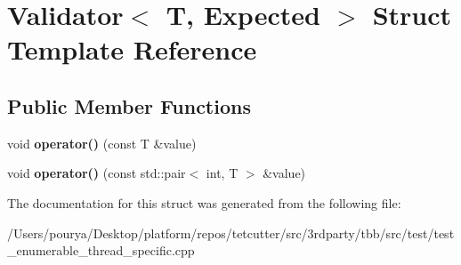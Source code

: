 \hypertarget{structValidator}{}\section{Validator$<$ T, Expected $>$ Struct Template Reference}
\label{structValidator}
\subsection*{Public Member Functions}
\begin{DoxyCompactItemize}
\item 
\hypertarget{structValidator_aafb2372151da415dc50d7d2e0b5b5c77}{}void {\bfseries operator()} (const T \&value)\label{structValidator_aafb2372151da415dc50d7d2e0b5b5c77}

\item 
\hypertarget{structValidator_ad3682fc867dacfd6cffcedd7c45162f9}{}void {\bfseries operator()} (const std\+::pair$<$ int, T $>$ \&value)\label{structValidator_ad3682fc867dacfd6cffcedd7c45162f9}

\end{DoxyCompactItemize}


The documentation for this struct was generated from the following file\+:\begin{DoxyCompactItemize}
\item 
/\+Users/pourya/\+Desktop/platform/repos/tetcutter/src/3rdparty/tbb/src/test/test\+\_\+enumerable\+\_\+thread\+\_\+specific.\+cpp\end{DoxyCompactItemize}
